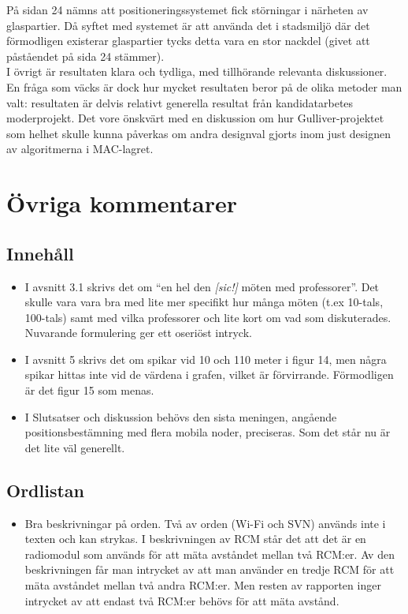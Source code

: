 \documentclass[a4paper,11pt]{article}
\begin{document}
På sidan 24 nämns att positioneringssystemet fick störningar i närheten av glaspartier. Då syftet med systemet är att använda det i stadsmiljö där det förmodligen existerar glaspartier tycks detta vara en stor nackdel (givet att påståendet på sida 24 stämmer). \\

I övrigt är resultaten klara och tydliga, med tillhörande relevanta diskussioner. En fråga som väcks är dock hur mycket resultaten beror på de olika metoder man valt: resultaten är delvis relativt generella resultat från kandidatarbetes moderprojekt. Det vore önskvärt med en diskussion om hur Gulliver-projektet som helhet skulle kunna påverkas om andra designval gjorts inom just designen av algoritmerna i MAC-lagret. \\

\section{Övriga kommentarer}

\subsection{Innehåll}

\begin{itemize}
   \item I avsnitt 3.1 skrivs det om “en hel den \emph{[sic!]} möten med professorer”. Det skulle vara vara bra med lite mer specifikt hur många möten (t.ex 10-tals, 100-tals) samt med vilka professorer och lite kort om vad som diskuterades. Nuvarande formulering ger ett oseriöst intryck.
   \item I avsnitt 5 skrivs det om spikar vid 10 och 110 meter i figur 14, men några spikar hittas inte vid de värdena i grafen, vilket är förvirrande. Förmodligen är det figur 15 som menas.
   \item I Slutsatser och diskussion behövs den sista meningen, angående positionsbestämning med flera mobila noder, preciseras. Som det står nu är det lite väl generellt. 
\end{itemize}

\subsection{Ordlistan}

\begin{itemize}
   \item Bra beskrivningar på orden. Två av orden (Wi-Fi och SVN) används inte i texten och kan strykas. I beskrivningen av RCM står det att det är en radiomodul som används för att mäta avståndet mellan två RCM:er. Av den beskrivningen får man intrycket av att man använder en tredje RCM för att mäta avståndet mellan två andra RCM:er. Men resten av rapporten inger intrycket av att endast två RCM:er behövs för att mäta avstånd.
\end{itemize}
\end{document}

